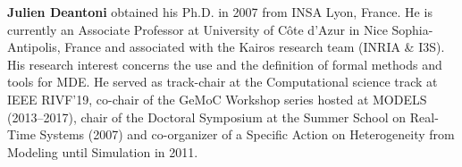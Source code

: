 \noindent
\textbf{Julien Deantoni} obtained his Ph.D. in 2007 from INSA Lyon, France. He is currently an Associate Professor at University of Côte d'Azur in Nice Sophia-Antipolis, France and associated with the Kairos research team (INRIA \& I3S).
His research interest concerns the use and the definition of formal methods and tools for MDE.
He served as track-chair at the Computational science track at IEEE RIVF'19, co-chair of the GeMoC Workshop series hosted at MODELS (2013--2017), chair of the Doctoral Symposium at the Summer School on Real-Time Systems (2007) and co-organizer of a Specific Action on Heterogeneity from Modeling until Simulation in 2011.

